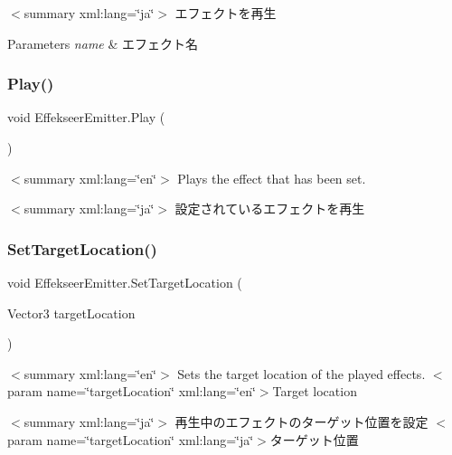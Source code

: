$<$summary xml\+:lang=\char`\"{}ja\char`\"{}$>$ エフェクトを再生 
\begin{DoxyParams}{Parameters}
{\em name} & エフェクト名\\
\hline
\end{DoxyParams}
\mbox{\label{class_effekseer_emitter_a55d07e8215485e43eaa94b7b075b2f04}} 
\subsubsection{\texorpdfstring{Play()}{Play()}\hspace{0.1cm}{\footnotesize\ttfamily [2/2]}}
{\footnotesize\ttfamily void Effekseer\+Emitter.\+Play (\begin{DoxyParamCaption}{ }\end{DoxyParamCaption})\hspace{0.3cm}{\ttfamily [inline]}}

$<$summary xml\+:lang=\char`\"{}en\char`\"{}$>$ Plays the effect that has been set. 

$<$summary xml\+:lang=\char`\"{}ja\char`\"{}$>$ 設定されているエフェクトを再生 \mbox{\label{class_effekseer_emitter_a39366319e460cc573d4bfc40803f6787}} 
\subsubsection{\texorpdfstring{Set\+Target\+Location()}{SetTargetLocation()}}
{\footnotesize\ttfamily void Effekseer\+Emitter.\+Set\+Target\+Location (\begin{DoxyParamCaption}\item[{Vector3}]{target\+Location }\end{DoxyParamCaption})\hspace{0.3cm}{\ttfamily [inline]}}

$<$summary xml\+:lang=\char`\"{}en\char`\"{}$>$ Sets the target location of the played effects. $<$param name=\char`\"{}target\+Location\char`\"{} xml\+:lang=\char`\"{}en\char`\"{}$>$Target location

$<$summary xml\+:lang=\char`\"{}ja\char`\"{}$>$ 再生中のエフェクトのターゲット位置を設定 $<$param name=\char`\"{}target\+Location\char`\"{} xml\+:lang=\char`\"{}ja\char`\"{}$>$ターゲット位置\mbox{\label{class_effekseer_emitter_acab7d9ae949cd0aa844ae66b2f44ad5d}} 
